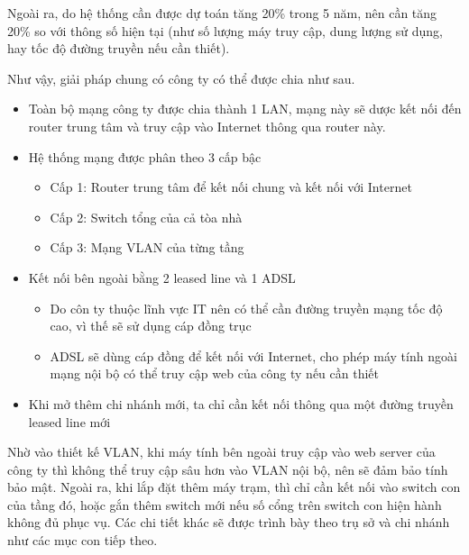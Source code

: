 \documentclass[a4paper]{article}
\begin{document}
Ngoài ra, do hệ thống cần được dự toán tăng 20\% trong 5 năm, nên cần tăng 20\% so với thông số hiện tại (như số lượng máy truy cập, dung lượng sử dụng, hay tốc độ đường truyền nếu cần thiết).

Như vậy, giải pháp chung có công ty có thể được chia như sau. 
\begin{itemize}
    \item Toàn bộ mạng công ty được chia thành 1 LAN, mạng này sẽ dược kết nối đến router trung tâm và truy cập vào Internet thông qua router này.
    \item Hệ thống mạng được phân theo 3 cấp bậc
    \begin{itemize}
        \item Cấp 1: Router trung tâm để kết nối chung và kết nối với Internet
        \item Cấp 2: Switch tổng của cả tòa nhà
        \item Cấp 3: Mạng VLAN của từng tầng
    \end{itemize}
    \item Kết nối bên ngoài bằng 2 leased line và 1 ADSL
    \begin{itemize}
        \item Do côn ty thuộc lĩnh vực IT nên có thể cần đường truyền mạng tốc độ cao, vì thế sẽ sử dụng cáp đồng trục
        \item ADSL sẽ dùng cáp đồng để kết nối với Internet, cho phép máy tính ngoài mạng nội bộ có thể truy cập web của công ty nếu cần thiết
    \end{itemize}
    \item Khi mở thêm chi nhánh mới, ta chỉ cần kết nối thông qua một đường truyền leased line mới
\end{itemize}
Nhờ vào thiết kế VLAN, khi máy tính bên ngoài truy cập vào web server của công ty thì không thể truy cập sâu hơn vào VLAN nội bộ, nên sẽ đảm bảo tính bảo mật. Ngoài ra, khi lắp đặt thêm máy trạm, thì chỉ cần kết nối vào switch con của tầng đó, hoặc gắn thêm switch mới nếu số cổng trên switch con hiện hành không đủ phục vụ. Các chi tiết khác sẽ được trình bày theo trụ sở và chi nhánh như các mục con tiếp theo.
\end{document}
